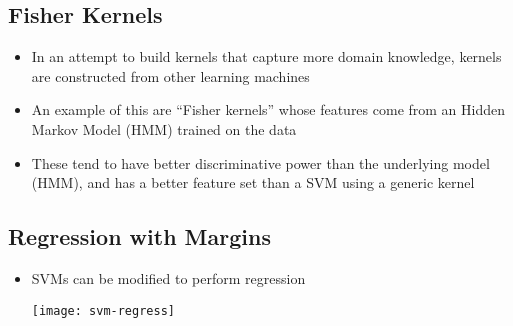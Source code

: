 \begin{slide}
\section{Fisher Kernels}

\begin{PauseHighLight}
  \begin{itemize}
  \item In an attempt to build kernels that capture more domain
    knowledge, kernels are constructed from other learning
    machines\pause
  \item An example of this are ``Fisher kernels'' whose features come
    from an Hidden Markov Model (HMM) trained on the data\pause
  \item These tend to have better discriminative power than the
    underlying model (HMM), and has a better feature set than a SVM
    using a generic kernel\pause
  \end{itemize}
\end{PauseHighLight}

\end{slide}





\Outline %



\begin{slide}
\section[-2]{Regression with Margins}

\begin{PauseHighLight}
  \begin{itemize}
  \item SVMs can be modified to perform regression
    \begin{center}
      \texttt{[image: svm-regress]}
    \end{center}
  \end{itemize}
\end{PauseHighLight}

\end{slide}


